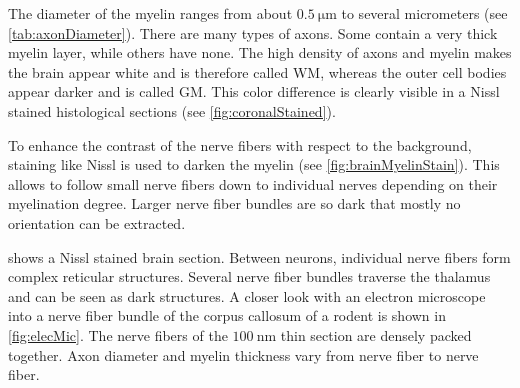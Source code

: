 The diameter of the myelin ranges from about $\SI{0.5}{\micro\meter}$ to several micrometers (see \cref{tab:axonDiameter}).
There are many types of axons.
Some contain a very thick myelin layer, while others have none.
The high density of axons and myelin makes the brain appear white and is therefore called \ac{WM}, whereas the outer cell bodies appear darker and is called \ac{GM}.
This color difference is clearly visible in a Nissl stained histological sections (see \cref{fig:coronalStained}).
\par
%
To enhance the contrast of the nerve fibers with respect to the background, staining like Nissl is used to darken the myelin (see \cref{fig:brainMyelinStain}).
This allows to follow small nerve fibers down to individual nerves depending on their myelination degree.
Larger nerve fiber bundles are so dark that mostly no orientation can be extracted.
\par
% 
 shows a Nissl stained brain section.
Between neurons, individual nerve fibers form complex reticular structures.
Several nerve fiber bundles traverse the thalamus and can be seen as dark structures.
A closer look with an electron microscope into a nerve fiber bundle of the corpus callosum of a rodent is shown in \cref{fig:elecMic}.
The nerve fibers of the $\SI{100}{\nano\meter}$ thin section are densely packed together.
Axon diameter and myelin thickness vary from nerve fiber to nerve fiber.
% 
